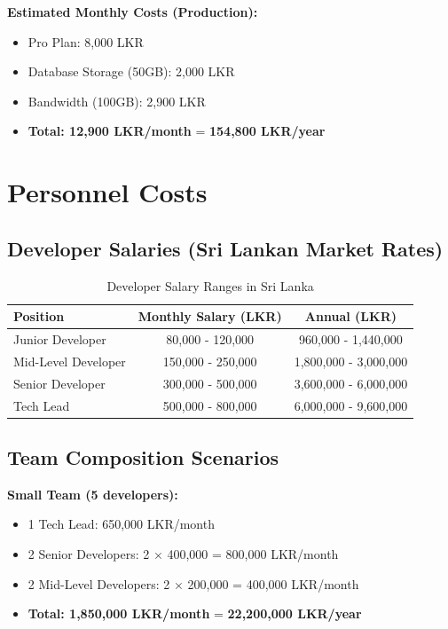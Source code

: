 \documentclass[12pt,a4paper]{article}
\begin{document}
\textbf{Estimated Monthly Costs (Production):}
\begin{itemize}
    \item Pro Plan: 8,000 LKR
    \item Database Storage (50GB): 2,000 LKR
    \item Bandwidth (100GB): 2,900 LKR
    \item \textbf{Total: 12,900 LKR/month} = \textbf{154,800 LKR/year}
\end{itemize}

\section{Personnel Costs}

\subsection{Developer Salaries (Sri Lankan Market Rates)}

\begin{table}[H]
\centering
\begin{tabular}{|l|c|c|}
\hline
\textbf{Position} & \textbf{Monthly Salary (LKR)} & \textbf{Annual (LKR)} \\
\hline
Junior Developer & 80,000 - 120,000 & 960,000 - 1,440,000 \\
Mid-Level Developer & 150,000 - 250,000 & 1,800,000 - 3,000,000 \\
Senior Developer & 300,000 - 500,000 & 3,600,000 - 6,000,000 \\
Tech Lead & 500,000 - 800,000 & 6,000,000 - 9,600,000 \\
\hline
\end{tabular}
\caption{Developer Salary Ranges in Sri Lanka}
\end{table}

\subsection{Team Composition Scenarios}

\textbf{Small Team (5 developers):}
\begin{itemize}
    \item 1 Tech Lead: 650,000 LKR/month
    \item 2 Senior Developers: 2 × 400,000 = 800,000 LKR/month
    \item 2 Mid-Level Developers: 2 × 200,000 = 400,000 LKR/month
    \item \textbf{Total: 1,850,000 LKR/month} = \textbf{22,200,000 LKR/year}
\end{itemize}
\end{document}
